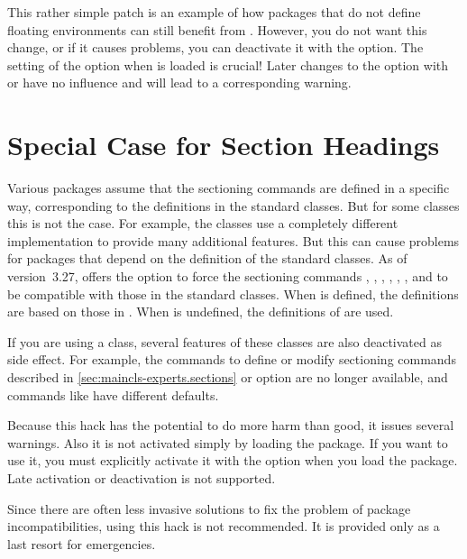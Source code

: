 This rather simple patch is an example of how packages that do not define
floating environments can still benefit from . However, you
do not want this change, or if it causes problems, you can deactivate it with
the %
 option.
The setting of the option when  is loaded
is crucial! Later changes to the option with
 or 
have no influence and will lead to a corresponding warning.%


\section{Special Case for Section Headings}

Various packages assume that the
sectioning commands are defined in a specific way, corresponding to the
definitions in the standard classes. But for some classes this is not the
case. For example, the \KOMAScript{} classes use a completely different
implementation to provide many additional features. But this can cause
problems for packages that depend on the definition of the standard classes.
As of version~3.27,  offers the option to force the
sectioning commands ,
,
,
,
,
, and
 to be compatible
with those in the standard classes. When  is
defined, the definitions are based on those in . When
 is undefined, the definitions of
 are used.

If you are using a \KOMAScript{} class, several features of these classes are
also deactivated as side effect. For example, the commands to define or
modify sectioning commands described in
\autoref{sec:maincls-experts.sections} or option
 are no longer available, and commands like
 have different defaults.

Because this hack has the potential to do more harm than good, it issues
several warnings. Also it is not activated simply by loading the
 package. If you want to use it, you must explicitly activate
it with the 
option when you load the package. Late activation or deactivation is not
supported.

Since there are often less invasive solutions to fix the problem of package
incompatibilities, using this hack is not recommended. It is provided only as
a last resort for emergencies.%
\EndIndexGroup

\endinput

